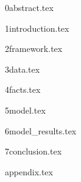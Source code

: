 \documentclass[12pt,english]{article}
\begin{document}
\newcommand{\var}{\text{var}}

{0abstract.tex}

{1introduction.tex}

{2framework.tex}

{3data.tex}

{4facts.tex}

{5model.tex}

{6model_results.tex}

{7conclusion.tex}





{appendix.tex}
\end{document}
